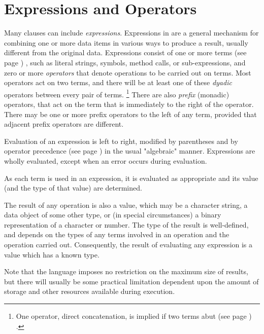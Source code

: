 \section{Expressions and Operators}\label{refexpr}
Many clauses can include \emph{expressions}.  Expressions in \nr{}
are a general mechanism for combining one or more data items in various
ways to produce a result, usually different from the original data.
Expressions consist of one or more  terms (see page \pageref{refterms}) , such as
literal strings, symbols, method calls, or sub-expressions,
and zero or more \emph{operators} that denote operations to be carried
out on terms.
Most operators act on two terms, and there will be at least one of these
\emph{dyadic} operators between every pair of terms.
\footnote{
One operator, direct concatenation, is implied if two terms
 abut (see page \pageref{refabut}) .
}
There are also \emph{prefix} (monadic) operators, that act on the
term that is immediately to the right of the operator.
There may be one or more prefix operators to the left of any term,
provided that adjacent prefix operators are different.

Evaluation of an expression is left to right, modified by parentheses
and by  operator precedence (see page \pageref{refpreced})  in the usual
"algebraic" manner.
Expressions are wholly evaluated, except when an error occurs during
evaluation.

As each term is used in an expression, it is evaluated as
appropriate and its value (and the type of that value) are determined.
 
The result of any operation is also a value, which may be a character
string, a data object of some other type, or (in special circumstances)
a binary representation of a character or number.  The type of the
result is well-defined, and depends on the types of any terms involved
in an operation and the operation carried out.
Consequently, the result of evaluating any expression is a value which
has a known type.
 
Note that the \nr{} language imposes no restriction on the maximum
size of results, but there will usually be some practical limitation
dependent upon the amount of storage and other resources available
during execution.
